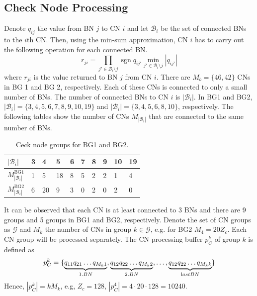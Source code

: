 \documentclass{article}
\def\Bcal{\mathcal{B}}
\def\Gcal{\mathcal{G}}
\def\Mb{{M_b}}
\def\Zc{{Z_c}}
\newcommand{\sgn}{\operatorname{sgn}}
\begin{document}
\newpage
\subsection{Check Node Processing}
\label{sec:check-node-proc}

Denote $q_{ij}$ the value from BN $j$ to CN $i$ and let $\Bcal_i$ be the set of connected BNs to the $i$th CN. Then, using the min-sum approximation, CN $i$ has to carry out the following operation for each connected BN.
\begin{equation}
  \label{eq:40}
  r_{ji} = \prod_{j'\in\Bcal_i\setminus j}\sgn q_{ij'}\min_{j'\in\Bcal_i\setminus j} |q_{ij'}|
\end{equation}
where $r_{ji}$ is the value returned to BN $j$ from CN $i$. There are $\Mb = \{46,42\}$ CNs in BG 1 and BG 2, respectively. Each of these CNs is connected to only a small number of BNs. The number of connected BNs to CN $i$ is $|\Bcal_i|$. In BG1 and BG2, $|\Bcal_i|=\{3,4,5,6,7,8,9,10,19\}$ and $|\Bcal_i|=\{3,4,5,6,8,10\}$, respectively. The following tables show the number of CNs $M_{|\Bcal_i|}$ that are connected to the same number of BNs.

\begin{table}[ht]
  \centering
  \begin{tabular}{llllllllll}
    \toprule
    $|\Bcal_i|$   & 3 & 4 & 5 & 6 & 7 & 8 & 9 & 10 & 19 \\
    \midrule
    $M_{|\Bcal_i|}^\mathrm{BG1}$ & 1 & 5  &18 & 8 & 5 & 2 & 2 & 1 & 4 \\
    $M_{|\Bcal_i|}^\mathrm{BG2}$ & 6 & 20 & 9 & 3 & 0 & 2 & 0 & 2 & 0 \\
    \bottomrule
  \end{tabular}
  \caption{Ceck node groups for BG1 and BG2.}
  \label{tab:checkNodeGroups}
\end{table}

It can be observed that each CN is at least connected to 3 BNs and there are 9 groups and 5 groups in BG1 and BG2, respectively. Denote the set of CN groups as $\Gcal$ and $M_k$ the number of CNs in group $k\in\Gcal$, e.g. for BG2 $M_4=20\Zc$. Each CN group will be processed separately. The CN processing buffer $p_C^k$ of group $k$ is defined as
\begin{equation}
  \label{eq:44}
  p_C^k = \{\underbrace{q_{11}q_{21}\dots q_{M_k 1}}_{\text 1. BN},\underbrace{q_{12}q_{22}\dots q_{M_k 2}}_{\text 2. BN},\dots,\underbrace{q_{12}q_{22}\dots q_{M_k k}}_{\text last BN}\}
\end{equation}
Hence, $|p_C^k| = kM_k$, e.g, $\Zc=128$, $|p_C^4| = 4\cdot 20\cdot 128 = 10240$.
\end{document}
